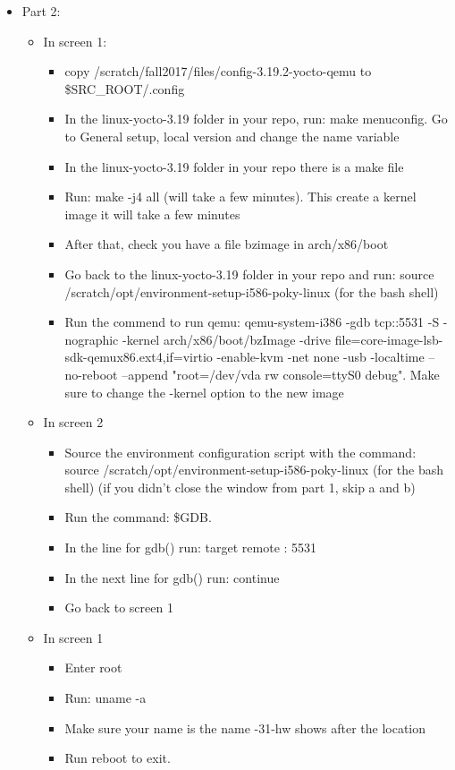 \documentclass{article}
\begin{document}
\begin{itemize}
\item Part 2:
\begin{itemize}
\item In screen 1:
\begin{itemize}
\item copy /scratch/fall2017/files/config-3.19.2-yocto-qemu to \$SRC\_ROOT/.config
\item In the linux-yocto-3.19 folder in your repo, run: make menuconfig. Go to General setup, local version and change the name variable
\item In the linux-yocto-3.19 folder in your repo there is a make file
\item Run: make -j4 all (will take a few minutes). This create a kernel image it will take a few minutes
\item After that, check you have a file bzimage in arch/x86/boot 
\item Go back to the linux-yocto-3.19 folder in your repo and run: source /scratch/opt/environment-setup-i586-poky-linux (for the bash shell)
\item Run the commend to run qemu: qemu-system-i386 -gdb tcp::5531 -S -nographic -kernel arch/x86/boot/bzImage -drive file=core-image-lsb-sdk-qemux86.ext4,if=virtio -enable-kvm -net none -usb -localtime --no-reboot --append "root=/dev/vda rw console=ttyS0 debug". Make sure to change the -kernel option to the new image
\end{itemize}
\item In screen 2
\begin{itemize}
\item Source the environment configuration script with the command: source /scratch/opt/environment-setup-i586-poky-linux (for the bash shell) (if you didn’t close the window from part 1, skip a and b)
\item Run the command: \$GDB.
\item In the line for gdb() run: target remote : 5531
\item In the next line for gdb() run: continue
\item Go back to screen 1
\end{itemize}
\item In screen 1
\begin{itemize}
\item Enter root
\item Run: uname -a 
\item Make sure your name is the name -31-hw shows after the location
\item Run reboot to exit.
\end{itemize}
\end{itemize}
\end{itemize}
\end{document}
